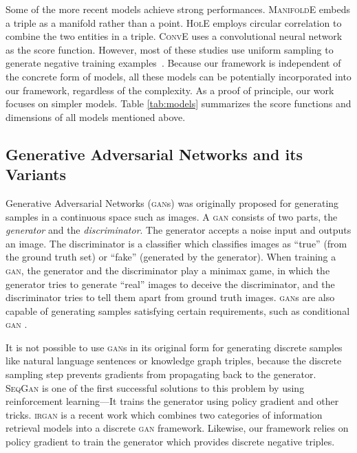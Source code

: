 \documentclass[11pt,a4paper]{article}
\begin{document}
Some of the more recent models achieve strong performances. \textsc{ManifoldE} \cite{manifolde} embeds a triple as a manifold rather than a point. \textsc{HolE} \cite{hole} employs circular correlation to combine the two entities in a triple. \textsc{ConvE} \cite{conve} uses a convolutional neural network as the score function. However, most of these studies use uniform sampling to generate negative training examples~\cite{bordes2013translating}. Because our framework is independent of the concrete form of models, all these models can be potentially incorporated into our framework, regardless of the complexity. As a proof of principle, our work focuses on simpler models. Table \ref{tab:models} summarizes the score functions and dimensions of all models mentioned above.


\subsection{Generative Adversarial Networks and its Variants}

Generative Adversarial Networks (\textsc{gan}s) \cite{goodfellow2014generative} was originally proposed for generating samples in a continuous space such as images. A \textsc{gan} consists of two parts, the \emph{generator} and the \emph{discriminator}. The generator accepts a noise input and outputs an image. The discriminator is a classifier which classifies images as ``true'' (from the ground truth set) or ``fake'' (generated by the generator). When training a \textsc{gan}, the generator and the discriminator play a minimax game, in which the generator tries to generate ``real'' images to deceive the discriminator, and the discriminator tries to tell them apart from ground truth images. \textsc{gan}s are also capable of generating samples satisfying certain requirements, such as conditional \textsc{gan} \cite{conditionalgan}.

It is not possible to use \textsc{gan}s in its original form for generating discrete samples like natural language sentences or knowledge graph triples, because the discrete sampling step prevents gradients from propagating back to the generator. \textsc{SeqGan} \cite{seqgan} is one of the first successful solutions to this problem by using reinforcement learning---It trains the generator using policy gradient and other tricks. \textsc{irgan} \cite{irgan} is a recent work which combines two categories of information retrieval models into a discrete \textsc{gan} framework. Likewise, our framework relies on policy gradient to train the generator which provides discrete negative triples.
\end{document}
